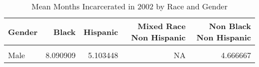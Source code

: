 \begin{table}[H]

\caption{\label{tab:tab:summarystats}Mean Months Incarcerated in 2002 by Race and Gender}
\centering
\begin{tabular}[t]{lrrrr}
\toprule
Gender & Black & Hispanic & Mixed Race Non Hispanic & Non Black Non Hispanic\\
\midrule
\cellcolor{gray!6}{Female} & \cellcolor{gray!6}{2.666667} & \cellcolor{gray!6}{4.500000} & \cellcolor{gray!6}{6} & \cellcolor{gray!6}{3.230769}\\
Male & 8.090909 & 5.103448 & NA & 4.666667\\
\bottomrule
\end{tabular}
\end{table}
